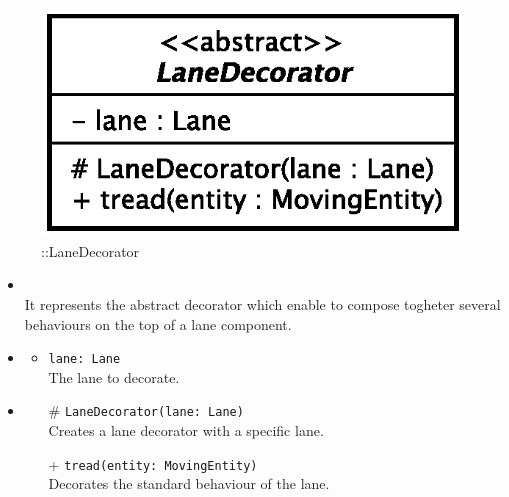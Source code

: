 \begin{figure}[h]
\centering
\includegraphics[scale=0.6,keepaspectratio]{images/solution/lane_decorator.eps}
\caption{\pReactiveComponentLaneDecoration::LaneDecorator}
\label{fig:sd-app-lane_decorator}
\end{figure}
\FloatBarrier
\begin{itemize}
  \item \textbf{\descr} \\
    It represents the abstract decorator which enable to compose togheter several
behaviours on the top of a lane component. 
  \item \textbf{\attrs}
  \begin{itemize}
    \item \texttt{lane: Lane} \\
The lane to decorate.
  \end{itemize}
  \item \textbf{\ops}
   \begin{itemize} 
   \item[\#] \texttt{LaneDecorator(lane: Lane)} \\
Creates a lane decorator with a specific lane.
    \item[+] \texttt{tread(entity: MovingEntity)} \\
Decorates the standard behaviour of the lane.  
  \end{itemize}
\end{itemize}
